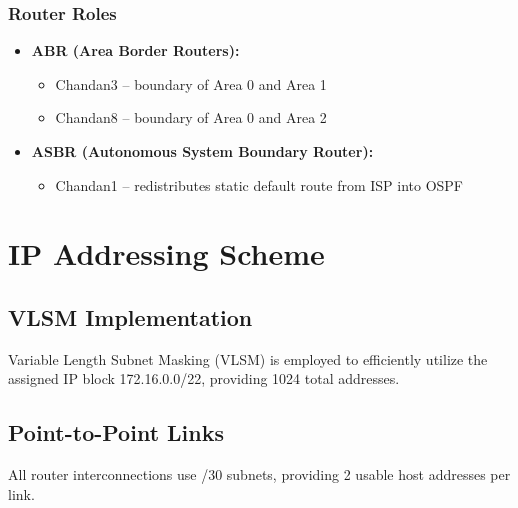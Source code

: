 \documentclass[12pt,a4paper]{report}
\begin{document}
\subsection{Router Roles}
\begin{itemize}[noitemsep]
    \item \textbf{ABR (Area Border Routers):}
    \begin{itemize}
        \item Chandan3 -- boundary of Area 0 and Area 1
        \item Chandan8 -- boundary of Area 0 and Area 2
    \end{itemize}
    \item \textbf{ASBR (Autonomous System Boundary Router):}
    \begin{itemize}
        \item Chandan1 -- redistributes static default route from ISP into OSPF
    \end{itemize}
\end{itemize}

\chapter{IP Addressing Scheme}

\section{VLSM Implementation}
Variable Length Subnet Masking (VLSM) is employed to efficiently utilize the assigned IP block 172.16.0.0/22, providing 1024 total addresses.

\section{Point-to-Point Links}
All router interconnections use /30 subnets, providing 2 usable host addresses per link.
\end{document}
